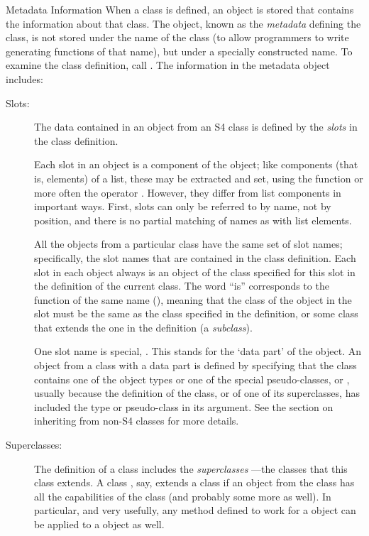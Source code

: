 \begin{Section}{Metadata Information}
When a class is defined, an object is stored that contains the
information about that class.  The object, known as the
\emph{metadata} defining the class, is not stored under the name of
the class (to allow programmers to write generating functions of
that name), but under a specially constructed name.
To examine the class definition, call .  The
information in the metadata object includes:

\begin{description}

\item[Slots:] 

The data contained in an object from an S4 class is defined by
the \emph{slots} in the class definition.

Each slot in an object is a component of the object;
like components (that is, elements) of a
list, these may be extracted and set, using the
function  or more often the operator
.  However, they
differ from list components in important ways.
First, slots can only be referred to by name, not by position,
and there is no partial matching of names as with list elements.

All the objects from a particular class have the same set of slot
names; specifically, the slot names that are contained in the
class definition.  Each slot in each object always is an object
of  the
class specified for this slot in the definition of the current class.
The word ``is'' corresponds to the \R{} function of the same
name (), meaning that the class of the object in
the slot must be the same as the class specified in the
definition, or some class that extends the one in the
definition (a \emph{subclass}).

One slot name is special, .  This stands for the
`data part' of the object.  An object from a class with a
data part is defined by specifying that the class contains one
of the \R{} object types or one of the special pseudo-classes, 
 or , usually because the definition of
the class, or of one of its superclasses, has included the type
or pseudo-class in its  argument.  See the
section on inheriting from non-S4 classes for more details.


\item[Superclasses:] 

The definition of a class includes the \emph{superclasses} ---the classes that this class extends.  A
class , say, extends a class  if an
object from the  class has all the capabilities of
the  class (and probably some more as well).  In
particular, and very usefully, any method defined to work for a
 object can be applied to a  object as
well.


\end{description}
\end{Section}
